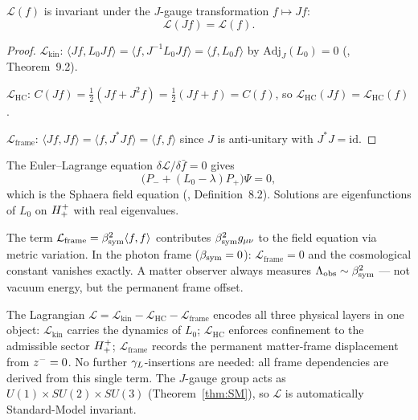 \begin{theorem}\label{thm:gauge-invariance}
$\mathcal{L}(f)$ is invariant under the $J$-gauge transformation
$f\mapsto Jf$:
\[
  \mathcal{L}(Jf) = \mathcal{L}(f).
\]
\end{theorem}

\begin{proof}
$\mathcal{L}_{\mathrm{kin}}$:
$\langle Jf,L_0 Jf\rangle = \langle f,J^{-1}L_0 Jf\rangle
= \langle f,L_0 f\rangle$
by $\mathrm{Adj}_J(L_0)=0$ (\cite{brendecke2026rh}, Theorem~9.2).

$\mathcal{L}_{\mathrm{HC}}$:
$C(Jf)=\tfrac{1}{2}(Jf+J^2 f)=\tfrac{1}{2}(Jf+f)=C(f)$,
so $\mathcal{L}_{\mathrm{HC}}(Jf)=\mathcal{L}_{\mathrm{HC}}(f)$.

$\mathcal{L}_{\mathrm{frame}}$:
$\langle Jf,Jf\rangle=\langle f,J^*Jf\rangle=\langle f,f\rangle$
since $J$ is anti-unitary with $J^*J=\mathrm{id}$.
\end{proof}

\begin{theorem}
\label{thm:eom}
The Euler--Lagrange equation $\delta\mathcal{L}/\delta\bar f=0$ gives
\[
  \bigl(P_-+(L_0-\lambda)P_+\bigr)\Psi=0,
\]
which is the Sphaera field equation (\cite{brendecke2026rh}, Definition~8.2).
Solutions are eigenfunctions of $L_0$ on $H^+_+$ with real
eigenvalues.
\end{theorem}

\begin{proposition}
\label{prop:lambda-from-frame}
The term $\mathcal{L}_{\mathrm{frame}}=\beta_{\mathrm{sym}}^2\langle f,f\rangle$
contributes $\beta_{\mathrm{sym}}^2 g_{\mu\nu}$ to the field equation via metric
variation.
In the photon frame ($\beta_{\mathrm{sym}}=0$): $\mathcal{L}_{\mathrm{frame}}=0$
and the cosmological constant vanishes exactly.
A matter observer always measures $\Lambda_{\mathrm{obs}}\sim\beta_{\mathrm{sym}}^2$
--- not vacuum energy, but the permanent frame offset.
\end{proposition}

\begin{remark}
The Lagrangian $\mathcal{L}=\mathcal{L}_{\mathrm{kin}}
-\mathcal{L}_{\mathrm{HC}}-\mathcal{L}_{\mathrm{frame}}$ encodes all
three physical layers in one object:
$\mathcal{L}_{\mathrm{kin}}$ carries the dynamics of $L_0$;
$\mathcal{L}_{\mathrm{HC}}$ enforces confinement to the admissible
sector $H^+_+$;
$\mathcal{L}_{\mathrm{frame}}$ records the permanent matter-frame
displacement from $z^-=0$.
No further $\gamma_L$-insertions are needed: all frame dependencies are
derived from this single term.
The $J$-gauge group acts as $U(1)\times SU(2)\times SU(3)$
(Theorem~\ref{thm:SM}), so $\mathcal{L}$ is automatically
Standard-Model invariant.
\end{remark}

